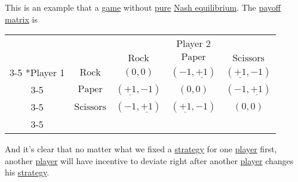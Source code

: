 \begin{eg}\label{eg:rock-paper-scissors}
	This is an example that a \hyperref[def:game]{game} without \hyperref[def:pure-strategy]{pure} \hyperref[def:Nash-equilibrium]{Nash equilibrium}.
	The \hyperref[def:payoff-matrix]{payoff matrix} is
	\begin{table}[H]
		\centering
		\setlength{\extrarowheight}{2pt}
		\begin{tabular}{cc|c|c|c|}
			                        & \multicolumn{1}{c}{} & \multicolumn{3}{c}{Player 2}                                                                                   \\
			                        & \multicolumn{1}{c}{} & \multicolumn{1}{c}{$\text{Rock}$} & \multicolumn{1}{c}{$\text{Paper}$} & \multicolumn{1}{c}{$\text{Scissors}$} \\\cline{3-5}
			\multirow{3}*{Player 1} & $\text{Rock}$        & $(0, 0)$                          & $(-1, \underline{+1})$             & $(\underline{+1}, -1)$                \\\cline{3-5}
			                        & $\text{Paper}$       & $(\underline{+1}, -1)$            & $(0, 0)$                           & $(-1, \underline{+1})$                \\\cline{3-5}
			                        & $\text{Scissors}$    & $(-1, \underline{+1})$            & $(\underline{+1}, -1)$             & $(0, 0)$                              \\\cline{3-5}
		\end{tabular}
	\end{table}
	And it's clear that no matter what we fixed a \hyperref[def:strategy]{strategy} for one \hyperref[def:player]{player} first, another \hyperref[def:player]{player}
	will have incentive to deviate right after another \hyperref[def:player]{player} changes his \hyperref[def:strategy]{strategy}.
\end{eg}

